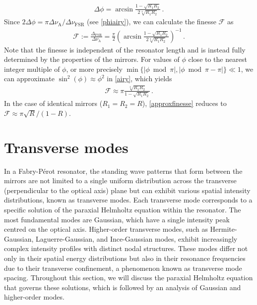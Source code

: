\documentclass[../Thesis-IJspeert.tex]{subfiles}
\begin{document}
\begin{align}
\Delta\phi=\arcsin{\frac{1-\sqrt{R_1R_2}}{2\sqrt[4]{R_1R_2}}}\,.
\end{align}
Since $2\Delta\phi={\pi\Delta\nu_\mathrm{A}}/{\Delta\nu_\mathrm{FSR}}$ (see \autoref{phiairy}), we can calculate the finesse $\mathcal{F}$ as
\begin{align}
\mathcal{F}:=\frac{\Delta_\mathrm{FSR}}{\Delta\nu_\mathrm{A}}=\frac{\pi}{2}\left(\arcsin{\frac{1-\sqrt{R_1R_2}}{2\sqrt[4]{R_1R_2}}}\right)^{-1}\,.
\end{align}
Note that the finesse is independent of the resonator length and is instead fully determined by the properties of the mirrors. For values of $\phi$ close to the nearest integer multiple of $\phi$, or more precisely $\min\{\lvert \phi \bmod \pi \rvert, \lvert \phi \bmod \pi - \pi\rvert\} \ll 1$, we can approximate $\sin^2(\phi)\approx\phi^2$ in \autoref{airy}, which yields
\begin{align}
\label{approxfinesse}
\mathcal{F}\approx \pi \frac{\sqrt[4]{R_1R_2}}{1-\sqrt{R_1R_2}}\,.
\end{align}
In the case of identical mirrors ($R_1=R_2=R$), \autoref{approxfinesse} reduces to $\mathcal{F}\approx \pi{\sqrt{R}}/(1-R)$.

\section{Transverse modes}
In a Fabry-Pérot resonator, the standing wave patterns that form between the mirrors are not limited to a single uniform distribution across the transverse (perpendicular to the optical axis) plane but can exhibit various spatial intensity distributions, known as transverse modes. Each transverse mode corresponds to a specific solution of the paraxial Helmholtz equation within the resonator. The most fundamental modes are Gaussian, which have a single intensity peak centred on the optical axis. Higher-order transverse modes, such as Hermite-Gaussian, Laguerre-Gaussian, and Ince-Gaussian modes, exhibit increasingly complex intensity profiles with distinct nodal structures. These modes differ not only in their spatial energy distributions but also in their resonance frequencies due to their transverse confinement, a phenomenon known as transverse mode spacing. Throughout this section, we will discuss the paraxial Helmholtz equation that governs these solutions, which is followed by an analysis of Gaussian and higher-order modes.
\end{document}
